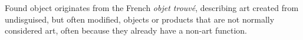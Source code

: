 




%
%
Found object originates from the French \textit{objet trouvé}, describing art created from undisguised, but often modified, objects or products that are not normally considered art, often because they already have a non-art function.



